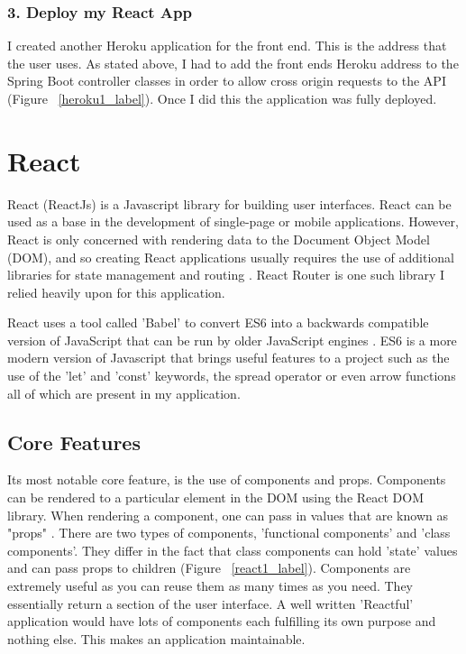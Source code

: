 \subsubsection{3. Deploy my React App}
I created another Heroku application for the front end. This is the address that the user uses. As stated above, I had to add the front ends Heroku address to the Spring Boot controller classes in order to allow cross origin requests to the API (Figure ~\ref{heroku1_label}). Once I did this the application was fully deployed.

\section{React}
React (ReactJs) is a Javascript library for building user interfaces. React can be used as a base in the development of single-page or mobile applications. However, React is only concerned with rendering data to the Document Object Model (DOM), and so creating React applications usually requires the use of additional libraries for state management and routing \cite{React:wiki}. React Router is one such library I relied heavily upon for this application.

React uses a tool called 'Babel' to convert ES6 into a backwards compatible version of JavaScript that can be run by older JavaScript engines \cite{Babel}. ES6 is a more modern version of Javascript that brings useful features to a project such as the use of the 'let' and 'const' keywords, the spread operator or even arrow functions all of which are present in my application.

\subsection{Core Features}
Its most notable core feature, is the use of components and props. Components can be rendered to a particular element in the DOM using the React DOM library. When rendering a component, one can pass in values that are known as "props" \cite{React:components}. There are two types of components, 'functional components' and 'class components'. They differ in the fact that class components can hold 'state' values and can pass props to children (Figure ~\ref{react1_label}). Components are extremely useful as you can reuse them as many times as you need. They essentially return a section of the user interface. A well written 'Reactful' application would have lots of components each fulfilling its own purpose and nothing else. This makes an application maintainable.

